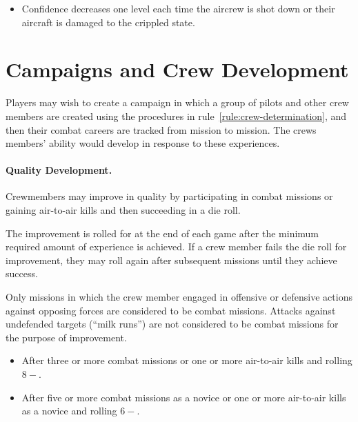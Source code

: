 \begin{advancedrules}
{\begin{itemize}
    \item Confidence decreases one level each time the aircrew is shot down or their aircraft is damaged to the crippled state. 

\end{itemize}


}{

\section{Campaigns and Crew Development}

Players may wish to create a campaign in which a group of pilots and other crew members are created using the procedures in rule~\ref{rule:crew-determination}, and then their combat careers are tracked from mission to mission. The crews members’ ability would develop in response to these experiences.

\paragraph{Quality Development.} 

Crewmembers may improve in quality by participating in combat missions or gaining air-to-air kills and then succeeding in a die roll. 

The improvement is rolled for at the end of each game after the minimum required amount of experience is achieved. If a crew member fails the die roll for improvement, they may roll again after subsequent missions until they achieve success.

Only missions in which the crew member engaged in offensive or defensive actions against opposing forces are considered to be combat missions. Attacks against undefended targets (“milk runs”) are not considered to be combat missions for the purpose of improvement.

\begin{itemize}

    \item {} After three or more combat missions or one or more air-to-air kills and rolling $8-$.

    \item {} After five or more combat missions as a novice or one or more air-to-air kills as a novice and rolling $6-$.


\end{itemize}}
\end{advancedrules}
